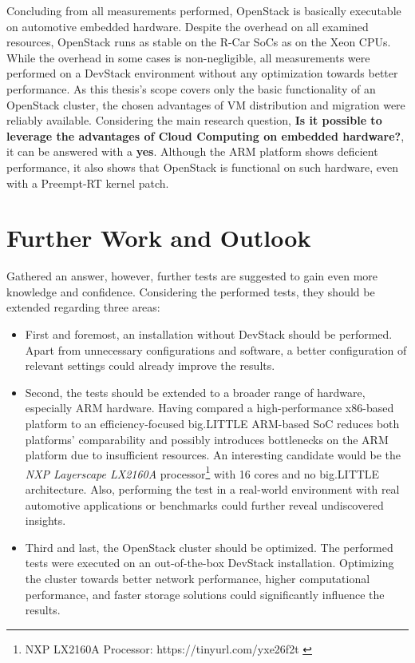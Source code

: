     \noindent Concluding from all measurements performed, OpenStack is basically executable on automotive embedded hardware.
    Despite the overhead on all examined resources, OpenStack runs as stable on the R-Car SoCs as on the Xeon CPUs.
    While the overhead in some cases is non-negligible, all measurements were performed on a DevStack environment without any optimization towards better performance.
    As this thesis's scope covers only the basic functionality of an OpenStack cluster, the chosen advantages of VM distribution and migration were reliably available.
    Considering the main research question, \textbf{Is it possible to leverage the advantages of Cloud Computing on embedded hardware?}, it can be answered with a \textbf{yes}.
    Although the ARM platform shows deficient performance, it also shows that OpenStack is functional on such hardware, even with a Preempt-RT kernel patch.
    
    
    \section{Further Work and Outlook}
    \label{section:further_work}
        
        Gathered an answer, however, further tests are suggested to gain even more knowledge and confidence.
        Considering the performed tests, they should be extended regarding three areas:
        
        \begin{itemize}
        
             \item First and foremost, an installation without DevStack should be performed.
            Apart from unnecessary configurations and software, a better configuration of relevant settings could already improve the results.
            
            \item Second, the tests should be extended to a broader range of hardware, especially ARM hardware.
            Having compared a high-performance x86-based platform to an efficiency-focused big.LITTLE ARM-based SoC reduces both platforms' comparability and possibly introduces bottlenecks on the ARM platform due to insufficient resources.
            An interesting candidate would be the \textsl{NXP Layerscape LX2160A} processor\footnote{NXP LX2160A Processor: https://tinyurl.com/yxe26f2t \cite{NXP2021}} with 16 cores and no big.LITTLE architecture.
            Also, performing the test in a real-world environment with real automotive applications or benchmarks could further reveal undiscovered insights.
           
           \item Third and last, the OpenStack cluster should be optimized.
            The performed tests were executed on an out-of-the-box DevStack installation.
            Optimizing the cluster towards better network performance, higher computational performance, and faster storage solutions could significantly influence the results.
        
        \end{itemize}
        
